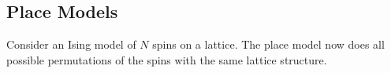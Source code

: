 \subsection{Place Models}
Consider an Ising model of $N$ spins on a lattice. The place model now does all possible permutations of the spins with the same lattice structure.




















\newpage


